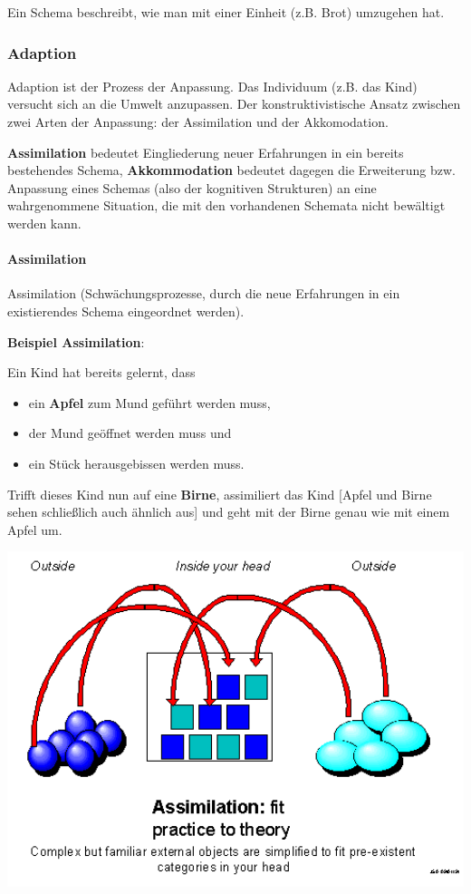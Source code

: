 \documentclass[
  letterpaper,
]{scrbook}
\let\oldparagraph\paragraph
\renewcommand{\paragraph}[1]{\oldparagraph{#1}\mbox{}}
\begin{document}
Ein Schema beschreibt, wie man mit einer Einheit (z.B. Brot) umzugehen
hat.

\hypertarget{adaption}{%
\subsubsection{Adaption}\label{adaption}}

Adaption ist der Prozess der Anpassung. Das Individuum (z.B. das Kind)
versucht sich an die Umwelt anzupassen. Der konstruktivistische Ansatz
zwischen zwei Arten der Anpassung: der Assimilation und der
Akkomodation.

\textbf{Assimilation} bedeutet Eingliederung neuer Erfahrungen in ein
bereits bestehendes Schema, \textbf{Akkommodation} bedeutet dagegen die
Erweiterung bzw. Anpassung eines Schemas (also der kognitiven
Strukturen) an eine wahrgenommene Situation, die mit den vorhandenen
Schemata nicht bewältigt werden kann.

\hypertarget{assimilation}{%
\paragraph{Assimilation}\label{assimilation}}

Assimilation (Schwächungsprozesse, durch die neue Erfahrungen in ein
existierendes Schema eingeordnet werden).

\textbf{Beispiel Assimilation}:

Ein Kind hat bereits gelernt, dass

\begin{itemize}
\item
  ein \textbf{Apfel} zum Mund geführt werden muss,
\item
  der Mund geöffnet werden muss und
\item
  ein Stück herausgebissen werden muss.
\end{itemize}

Trifft dieses Kind nun auf eine \textbf{Birne}, assimiliert das Kind
{[}Apfel und Birne sehen schließlich auch ähnlich aus{]} und geht mit
der Birne genau wie mit einem Apfel um.

\includegraphics[width=1\textwidth,height=\textheight]{./pictures/assimilation.png}
\end{document}
